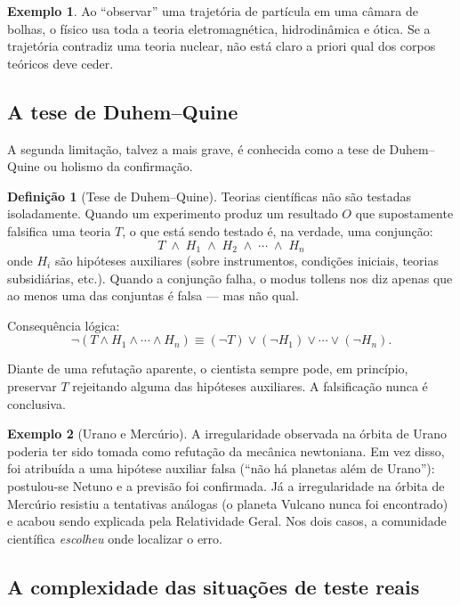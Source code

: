 \documentclass[9pt,a4paper]{extarticle}
\newcommand{\impt}[1]{\textcolor{important}{#1}}
\newcommand{\ntc}[1]{\textcolor{notice}{#1}}
\theoremstyle{definition}
\newtheorem{definition}{Definição}[section]
\newtheorem{example}{Exemplo}[section]
\begin{document}
\begin{example}
Ao ``observar'' uma trajetória de partícula em uma câmara de bolhas, o físico usa toda a teoria eletromagnética, hidrodinâmica e ótica. Se a trajetória contradiz uma teoria nuclear, não está claro a priori qual dos corpos teóricos deve ceder.
\end{example}

\subsection{A tese de Duhem--Quine}

A segunda limitação, talvez a mais grave, é conhecida como a \impt{tese de Duhem--Quine} ou \impt{holismo da confirmação}.

\begin{definition}[Tese de Duhem--Quine]
Teorias científicas não são testadas isoladamente. Quando um experimento produz um resultado $O$ que supostamente falsifica uma teoria $T$, o que está sendo testado é, na verdade, uma \impt{conjunção}:
\[
T \;\wedge\; H_1 \;\wedge\; H_2 \;\wedge\; \cdots \;\wedge\; H_n
\]
onde $H_i$ são hipóteses auxiliares (sobre instrumentos, condições iniciais, teorias subsidiárias, etc.). Quando a conjunção falha, o modus tollens nos diz apenas que \impt{ao menos uma} das conjuntas é falsa --- mas não qual.
\end{definition}

\ntc{Consequência lógica:}
\[
\neg (T \wedge H_1 \wedge \cdots \wedge H_n) \equiv (\neg T) \vee (\neg H_1) \vee \cdots \vee (\neg H_n).
\]

Diante de uma refutação aparente, o cientista sempre pode, em princípio, preservar $T$ rejeitando alguma das hipóteses auxiliares. \impt{A falsificação nunca é conclusiva.}

\begin{example}[Urano e Mercúrio]
A irregularidade observada na órbita de Urano poderia ter sido tomada como refutação da mecânica newtoniana. Em vez disso, foi atribuída a uma hipótese auxiliar falsa (``não há planetas além de Urano''): postulou-se Netuno e a previsão foi confirmada. Já a irregularidade na órbita de Mercúrio resistiu a tentativas análogas (o planeta Vulcano nunca foi encontrado) e acabou sendo explicada pela Relatividade Geral. Nos dois casos, a comunidade científica \emph{escolheu} onde localizar o erro.
\end{example}

\subsection{A complexidade das situações de teste reais}
\end{document}
